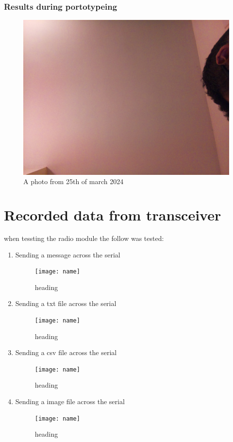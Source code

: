 \subsubsection{Results during portotypeing}
\begin{figure}[h!]
    \centering
    \includegraphics[width=0.4\linewidth]{Images/camera_output_2024-03-21_21-43-16.png}
    \caption{A photo from 25th of march 2024 }
    \label{A photo from 25th of march 2024}
\end{figure}

\section{Recorded data from transceiver}
when tessting  the radio module the follow was tested:
\begin{enumerate}
    \item Sending a message across the serial
    \begin{figure}[h!]
        \centering
        \texttt{[image: name]}
        \caption*{heading}
        \label{}
    \end{figure}
    \item Sending a txt file across the serial
    \begin{figure}[h!]
        \centering
        \texttt{[image: name]}
        \caption*{heading}
        \label{}
    \end{figure}
    \item Sending a csv file across the serial
    \begin{figure}[h!]
        \centering
        \texttt{[image: name]}
        \caption*{heading}
        \label{}
    \end{figure}
    \item Sending a image file across the serial
    \begin{figure}[h!]
        \centering
        \texttt{[image: name]}
        \caption*{heading}
        \label{}
    \end{figure}
\end{enumerate}
